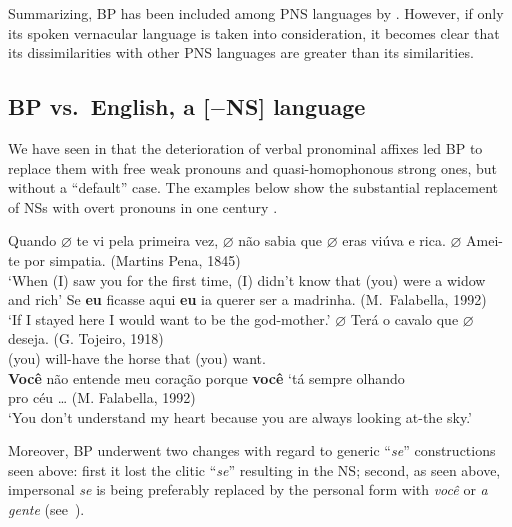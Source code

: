 \documentclass[output=paper]{langsci/langscibook}
\begin{document}
Summarizing, \gls{BP} has been included among
\gls{PNS} languages by \citet{HolShee2010}. However, if only its spoken
vernacular language is taken into consideration, it becomes clear that its
dissimilarities with other \gls{PNS} languages are greater than  its
similarities.

\subsection{BP vs.\ English, a [$-$NS] language}\label{sec:26.3.4}

We have seen in  that the deterioration of verbal pronominal
affixes led \gls{BP} to replace them with free weak
pronouns and quasi-homophonous strong ones, but without a “default”
case. The examples below show the substantial replacement of NSs with overt
pronouns in one century \parencite{Duarte1993,Duarte2012}.\newpage

\ea%
    \label{ex:26.42}
    \ea     Quando \textbf{$\varnothing$\tss{\Fsg}} te vi pela
    primeira vez, \textbf{$\varnothing$\tss{\Fsg}} não sabia que
    \textbf{$\varnothing$\tss{\Ssg}} eras viúva e rica.
    \textbf{$\varnothing$\tss{\Fsg}} Amei-te por simpatia.  (Martins
    Pena, 1845)\\ ‘When (I) saw you for the first time, (I) didn’t know that
    (you) were a widow and rich’
    \ex     Se \textbf{eu} ficasse aqui \textbf{eu} ia querer ser a madrinha.
    (M.\ Falabella, 1992)\\ ‘If  I   stayed here  I would want to be the
    god-mother.’
    \z
\ex%
    \label{ex:26.43}
    \ea
	\gll	\textbf{$\varnothing$\tss{\Ssg}} Terá o cavalo que \textbf{$\varnothing$\tss{\Ssg}} deseja. (G. Tojeiro, 1918)\\
			(you) will-have the horse that (you) want.\\
	\ex	    \textbf{Você} não entende meu coração porque \textbf{você} ‘tá sempre olhando\\
			pro céu \dots{} (M. Falabella, 1992) \\
	        \enquote*{You don't understand my heart because  you are always looking at-the sky.}
    \z
\z

Moreover, \gls{BP} underwent two changes with regard
to generic “\emph{se}” constructions seen above:  first it lost the clitic
“\emph{se}” resulting in the NS; second, as seen above, impersonal
\emph{se} is being preferably replaced by the personal form with
\emph{você} or \emph{a gente} (see~).
\end{document}
